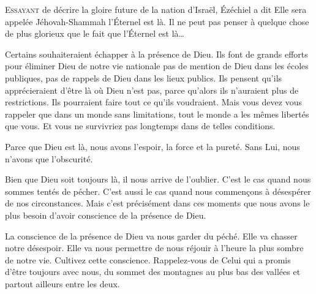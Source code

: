 \dvrule







\lettrine{E}{ssayant} de décrire la gloire future de la nation d'Israël,
 Ézéchiel a dit\frcolon{} 
 \Og Elle sera appelée Jéhovah-Shammah \ocadr l'Éternel est là. \Fg{}
 Il ne peut pas penser à quelque chose de plus glorieux
 que le fait que l'Éternel est là\dots{}

Certains souhaiteraient échapper à la présence de Dieu.
 Ils font de grands efforts pour éliminer Dieu de notre vie nationale
 \ocadr pas de mention de Dieu dans les écoles publiques,
 pas de rappels de Dieu dans les lieux publics.
 Ils pensent qu'ils apprécieraient d'être là où Dieu n'est pas,
 parce qu'alors ils n'auraient plus de restrictions.
 Ils pourraient faire tout ce qu'ils voudraient.
 Mais vous devez vous rappeler que dans un monde sans limitations,
 tout le monde a les mêmes libertés que vous.
 Et vous ne survivriez pas longtemps dans de telles conditions. 


Parce que Dieu est là, nous avons l'espoir, la force et la pureté.
 Sans Lui, nous n'avons que l'obscurité. 

Bien que Dieu soit toujours là, il nous arrive de l'oublier.
 C'est le cas quand nous sommes tentés de pécher.
 C'est aussi le cas quand nous commen\c{c}ons à désespérer de nos circonstances.
 Mais c'est précisément dans ces moments que nous avons le plus besoin
 d'avoir conscience de la présence de Dieu. 

La conscience de la présence de Dieu va nous garder du péché.
 Elle va chasser notre désespoir. Elle va nous permettre de nous réjouir
 à l'heure la plus sombre de notre vie. Cultivez cette conscience.
 Rappelez-vous de Celui qui a promis d'être toujours avec nous,
 du sommet des montagnes au plus bas des vallées
 et partout ailleurs entre les deux.

